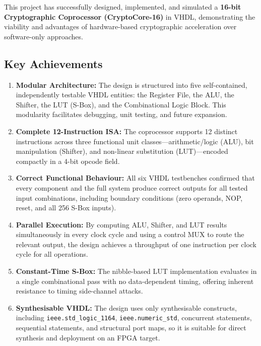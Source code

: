 \documentclass[12pt, a4paper]{report}
\begin{document}
This project has successfully designed, implemented, and simulated a
\textbf{16-bit Cryptographic Coprocessor (CryptoCore-16)} in VHDL,
demonstrating the viability and advantages of hardware-based cryptographic
acceleration over software-only approaches.

\subsection*{Key Achievements}

\begin{enumerate}[label=\arabic*.]
  \item \textbf{Modular Architecture:} The design is structured into five
        self-contained, independently testable VHDL entities: the Register File,
        the ALU, the Shifter, the LUT (S-Box), and the Combinational Logic Block.
        This modularity facilitates debugging, unit testing, and future expansion.

  \item \textbf{Complete 12-Instruction ISA:} The coprocessor supports 12 distinct
        instructions across three functional unit classes—arithmetic/logic (ALU),
        bit manipulation (Shifter), and non-linear substitution (LUT)—encoded
        compactly in a 4-bit opcode field.

  \item \textbf{Correct Functional Behaviour:} All six VHDL testbenches confirmed
        that every component and the full system produce correct outputs for all
        tested input combinations, including boundary conditions (zero operands,
        NOP, reset, and all 256 S-Box inputs).

  \item \textbf{Parallel Execution:} By computing ALU, Shifter, and LUT results
        simultaneously in every clock cycle and using a control MUX to route the
        relevant output, the design achieves a throughput of one instruction per
        clock cycle for all operations.

  \item \textbf{Constant-Time S-Box:} The nibble-based LUT implementation evaluates
        in a single combinational pass with no data-dependent timing, offering
        inherent resistance to timing side-channel attacks.

  \item \textbf{Synthesisable VHDL:} The design uses only synthesisable constructs, including
        \texttt{ieee.std\_logic\_1164}, \texttt{ieee.numeric\_std}, concurrent statements,
        sequential statements, and structural port maps, so it is suitable for direct
        synthesis and deployment on an FPGA target.
\end{enumerate}
\end{document}

